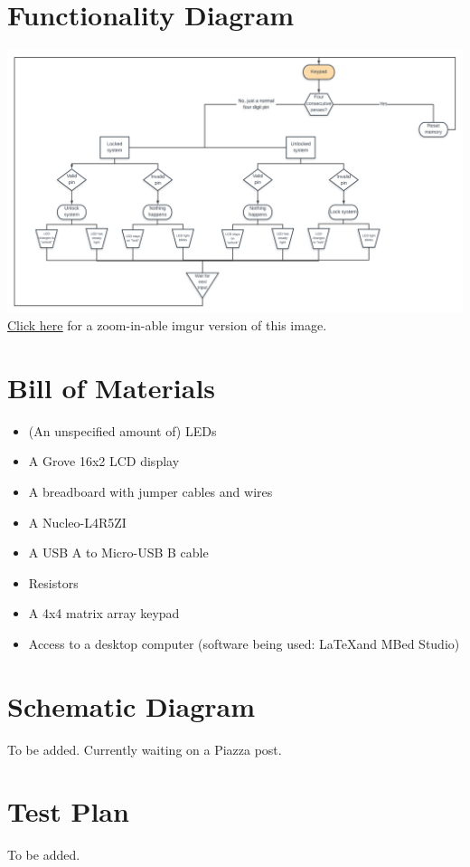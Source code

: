 \documentclass[10pt,a4paper]{article}
\begin{document}
\section{Functionality Diagram}
\includegraphics[width=\linewidth]{Flowchart}\\
\href{https://i.imgur.com/97heoRu.png}{\underline{Click here}} for a zoom-in-able imgur version of this image.
\pagebreak
\section{Bill of Materials}
\begin{itemize}
	\item (An unspecified amount of) LEDs
	\item A Grove 16x2 LCD display
	\item A breadboard with jumper cables and wires
	\item A Nucleo-L4R5ZI
	\item A USB A to Micro-USB B cable
	\item Resistors
	\item A 4x4 matrix array keypad
	\item Access to a desktop computer (software being used: \LaTeX and MBed Studio)
\end{itemize}
\pagebreak
\section{Schematic Diagram}
To be added. Currently waiting on a Piazza post.
\pagebreak
\section{Test Plan}
To be added. 
\end{document}
